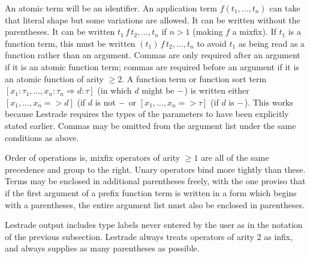 \documentclass[12pt]{article}
\begin{document}
An atomic term will be an identifier.  An application term $f(t_1,\ldots,t_n)$ can take that literal shape but some variations are allowed.  It can be written without the parentheses.  It can be written $t_1\, f \,t_2,\ldots,t_n$ if $n>1$ (making $f$ a mixfix).  If $t_1$ is a function term, this must be written
$(t_1) \,f \,t_2,\ldots,t_n$ to avoid $t_1$ as being read as a function rather than an argument.  Commas are only required
after an argument if it is an atomic function term;  commas are required before an argument if it is an atomic function of arity $\geq 2$.  A function term or function sort term $[x_1:\tau_1,\ldots,x_n:\tau_n \Rightarrow d:\tau]$ (in which $d$ might be ${\tt -}$) is written either $[x_1,\ldots,x_n=>d]$ (if $d$ is not ${\tt -}$ or $[x_1,\ldots,x_n=>\tau]$ (if $d$ is ${\tt -}$).  This works because Lestrade requires the types of the parameters to have been explicitly stated earlier.  Commas may be omitted from the argument list under the same conditions as above.

Order of operations is, mixfix operators of arity $\geq 1$ are all of the same precedence and group to the right.
Unary operators bind more tightly than these.  Terms may be enclosed in additional parentheses freely, with the one proviso that if the first argument of a prefix function term is written in a form which begins with a parentheses, the entire argument list must
also be enclosed in parentheses.
 
Lestrade output includes type labels never entered by the user as in the notation of the previous subsection.
Lestrade always treats operators of arity 2 as infix, and always supplies as many parentheses as possible.
\end{document}
